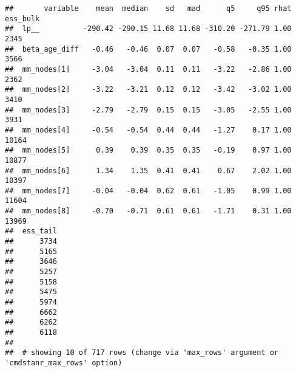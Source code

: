 \documentclass[
]{article}
\begin{document}
\begin{verbatim}
##       variable    mean  median    sd   mad      q5     q95 rhat ess_bulk
##  lp__          -290.42 -290.15 11.68 11.68 -310.20 -271.79 1.00     2345
##  beta_age_diff   -0.46   -0.46  0.07  0.07   -0.58   -0.35 1.00     3566
##  mm_nodes[1]     -3.04   -3.04  0.11  0.11   -3.22   -2.86 1.00     2362
##  mm_nodes[2]     -3.22   -3.21  0.12  0.12   -3.42   -3.02 1.00     3410
##  mm_nodes[3]     -2.79   -2.79  0.15  0.15   -3.05   -2.55 1.00     3931
##  mm_nodes[4]     -0.54   -0.54  0.44  0.44   -1.27    0.17 1.00    10164
##  mm_nodes[5]      0.39    0.39  0.35  0.35   -0.19    0.97 1.00    10877
##  mm_nodes[6]      1.34    1.35  0.41  0.41    0.67    2.02 1.00    10397
##  mm_nodes[7]     -0.04   -0.04  0.62  0.61   -1.05    0.99 1.00    11604
##  mm_nodes[8]     -0.70   -0.71  0.61  0.61   -1.71    0.31 1.00    13969
##  ess_tail
##      3734
##      5165
##      3646
##      5257
##      5158
##      5475
##      5974
##      6662
##      6262
##      6118
## 
##  # showing 10 of 717 rows (change via 'max_rows' argument or 'cmdstanr_max_rows' option)
\end{verbatim}
\end{document}
